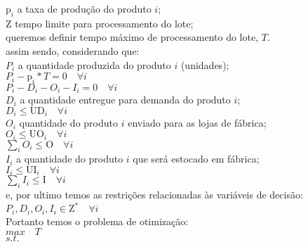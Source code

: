 \documentclass{book}
\begin{document}
$\textrm{p}_i$ a taxa de produção do produto $i$; \\

$\textrm{Z}$ tempo limite para processamento do lote; \\

queremos definir tempo máximo de processamento do lote, $T$. \\

assim sendo, considerando que: \\

$P_i$ a quantidade produzida do produto $i$ (unidades); \\

$P_i - \textrm{p}_i * T  = 0 \quad \forall i$ \\

$P_i - D_i - O_i - I_i = 0 \quad \forall i$ \\

$D_i$ a quantidade entregue para demanda do produto $i$; \\

$D_i \leq \textrm{UD}_i \quad \forall i$ \\

$O_i$ quantidade do produto $i$ enviado para as lojas de fábrica; \\

$O_i \leq \textrm{UO}_i \quad \forall i$\\

$\sum_i{O_i} \leq \textrm{O} \quad \forall i$ \\

$I_i$ a quantidade do produto $i$ que será estocado em fábrica; \\

$I_i \leq \textrm{UI}_i \quad \forall i$ \\

$\sum_i{I_i} \leq \textrm{I} \quad \forall i$ \\

e, por ultimo temos as restrições relacionadas às variáveis de decisão: \\

$P_i, D_i, O_i, I_i \in \textrm{Z}^* \quad \forall i $ \\


Portanto temos o problema de otimização: \\


$max \quad T$ \\

$s.t.$ \\
\end{document}
